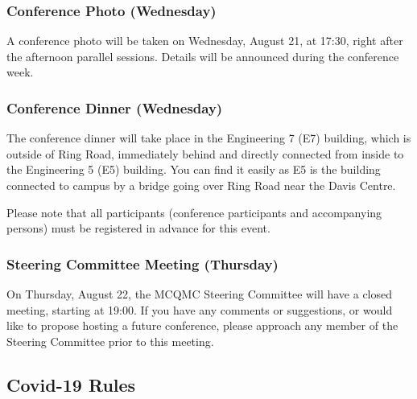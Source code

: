 
\subsubsection{Conference Photo (Wednesday)}

A conference photo will be taken on Wednesday, August 21, at 17:30, right after the afternoon parallel sessions. Details will be announced 
during the conference week.



\subsubsection{Conference Dinner (Wednesday)}

The conference dinner will take place in the Engineering 7 (E7) building, which is outside of Ring Road, immediately behind and directly connected from inside to the Engineering 5 (E5) building. You can find it easily as E5 is the building connected to campus by a bridge going over Ring Road near the Davis Centre. 

Please note that all participants (conference participants and accompanying persons) must be registered in advance for this event.


\subsubsection{Steering Committee Meeting (Thursday)}

On Thursday, August 22, the MCQMC Steering Committee will have a closed meeting, starting at 19:00. If
you have any comments or suggestions, or would like to propose hosting a
future conference, please approach any member of the Steering Committee
prior to this meeting. 




\iffalse
\subsection{Covid-19 Rules}

